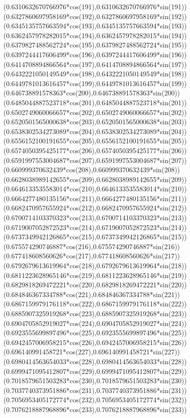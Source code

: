 {({0.6310632670766976*cos(191)},{0.6310632670766976*sin(191)})
({0.6327860697958169*cos(192)},{0.6327860697958169*sin(192)})
({0.6345135757663594*cos(193)},{0.6345135757663594*sin(193)})
({0.6362457978282015*cos(194)},{0.6362457978282015*sin(194)})
({0.6379827488562724*cos(195)},{0.6379827488562724*sin(195)})
({0.6397244417606499*cos(196)},{0.6397244417606499*sin(196)})
({0.6414708894866564*cos(197)},{0.6414708894866564*sin(197)})
({0.6432221050149549*cos(198)},{0.6432221050149549*sin(198)})
({0.6449781013616457*cos(199)},{0.6449781013616457*sin(199)})
({0.646738891578363*cos(200)},{0.646738891578363*sin(200)})
({0.6485044887523718*cos(201)},{0.6485044887523718*sin(201)})
({0.6502749060066657*cos(202)},{0.6502749060066657*sin(202)})
({0.6520501565000638*cos(203)},{0.6520501565000638*sin(203)})
({0.6538302534273089*cos(204)},{0.6538302534273089*sin(204)})
({0.6556152100191655*cos(205)},{0.6556152100191655*sin(205)})
({0.6574050395425177*cos(206)},{0.6574050395425177*sin(206)})
({0.6591997553004687*cos(207)},{0.6591997553004687*sin(207)})
({0.660999370632439*cos(208)},{0.660999370632439*sin(208)})
({0.6628038989142655*cos(209)},{0.6628038989142655*sin(209)})
({0.6646133535583014*cos(210)},{0.6646133535583014*sin(210)})
({0.6664277480135156*cos(211)},{0.6664277480135156*sin(211)})
({0.6682470957655924*cos(212)},{0.6682470957655924*sin(212)})
({0.6700714103370323*cos(213)},{0.6700714103370323*sin(213)})
({0.6719007052872523*cos(214)},{0.6719007052872523*sin(214)})
({0.6737349942126865*cos(215)},{0.6737349942126865*sin(215)})
({0.675574290746887*cos(216)},{0.675574290746887*sin(216)})
({0.677418608560626*cos(217)},{0.677418608560626*sin(217)})
({0.6792679613619964*cos(218)},{0.6792679613619964*sin(218)})
({0.6811223628965146*cos(219)},{0.6811223628965146*sin(219)})
({0.6829818269472221*cos(220)},{0.6829818269472221*sin(220)})
({0.684846367334788*cos(221)},{0.684846367334788*sin(221)})
({0.6867159979176118*cos(222)},{0.6867159979176118*sin(222)})
({0.6885907325919268*cos(223)},{0.6885907325919268*sin(223)})
({0.6904705852919027*cos(224)},{0.6904705852919027*sin(224)})
({0.6923555699897496*cos(225)},{0.6923555699897496*sin(225)})
({0.6942457006958215*cos(226)},{0.6942457006958215*sin(226)})
({0.696140991458721*cos(227)},{0.696140991458721*sin(227)})
({0.6980414563654033*cos(228)},{0.6980414563654033*sin(228)})
({0.6999471095412807*cos(229)},{0.6999471095412807*sin(229)})
({0.7018579651503283*cos(230)},{0.7018579651503283*sin(230)})
({0.7037740373951886*cos(231)},{0.7037740373951886*sin(231)})
({0.7056953405172774*cos(232)},{0.7056953405172774*sin(232)})
({0.7076218887968896*cos(233)},{0.7076218887968896*sin(233)})
}
